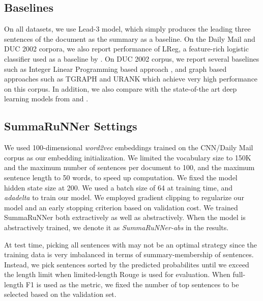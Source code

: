 \documentclass[letterpaper]{article}
\begin{document}
\subsection{Baselines} 
On all datasets, we use Lead-3 model, which simply produces the leading three sentences of the document as the summary as a baseline. On the Daily Mail and DUC 2002 corpora, we also report performance of LReg, a feature-rich logistic classifier used as a baseline by \cite{jianpeng}. On DUC 2002 corpus, we report several baselines such as Integer Linear Programming based approach \cite{ilp}, and graph based approaches such as TGRAPH \cite{tgraph} and URANK \cite{urank} which achieve very high performance on this corpus. In addition, we also compare with the state-of-the art deep learning models from \cite{jianpeng} and \cite{nallapati_conll}.









\subsection{SummaRuNNer Settings} We used 100-dimensional {\it word2vec} \cite{mikolovWord2vec:13} embeddings trained on the CNN/Daily Mail corpus as our embedding initialization. We limited the vocabulary size to 150K and the maximum number of sentences per document to 100, and the maximum sentence length to 50 words, to speed up computation. We fixed the model hidden state size at 200. We used a batch size of 64 at training time, and {\it adadelta} \cite{adadelta} to train our model. We employed gradient clipping to regularize our model and an early stopping criterion based on validation cost. We trained SummaRuNNer both extractively as well as abstractively. When the model is abstractively trained, we denote it as {\it SummaRuNNer-abs} in the results.


At test time, picking all sentences with  may not be an optimal strategy since the training data is very imbalanced in terms of summary-membership of sentences. Instead, we pick sentences sorted by the predicted probabilites until we exceed the length limit when limited-length Rouge is used for evaluation. When full-length F1 is used as the metric, we fixed the number of top sentences to be selected based on the validation set. 
\end{document}
